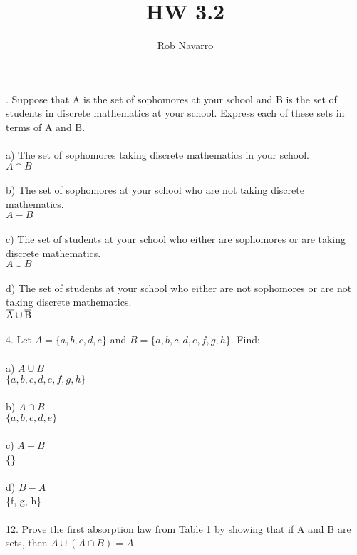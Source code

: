 \documentclass[11pt, oneside]{article}   	%
\title{HW 3.2}
\author{Rob Navarro}
\begin{document}
\maketitle

. Suppose that A is the set of sophomores at your school and B is the set of students in discrete mathematics at your school. Express each of these sets in terms of A and B.\\\\
a) The set of sophomores taking discrete mathematics in your school.\\
$A\cap B$\\\\
b) The set of sophomores at your school who are not taking discrete mathematics.\\
$A - B$\\\\
c) The set of students at your school who either are sophomores or are taking discrete mathematics.\\
$A\cup B$\\\\
d) The set of students at your school who either are not sophomores or are not taking discrete mathematics.\\
$\overline{\rm A}\cup\overline{\rm B}$\\\\
4. Let $A = \{a, b, c, d, e\}$ and $B = \{a, b, c, d, e, f, g, h\}$. Find: \\\\
a) $A\cup B$\\
$\{a, b, c, d, e, f, g, h\}$\\\\
b) $A\cap B$\\
$\{a, b, c, d, e\}$\\\\
c) $A - B$\\
\{\}\\\\
d) $B - A$\\
\{f, g, h\}\\\\
12. Prove the first absorption law from Table 1 by showing that if A and B are sets, then $A\cup(A\cap B) = A$.\\\
\end{document}
